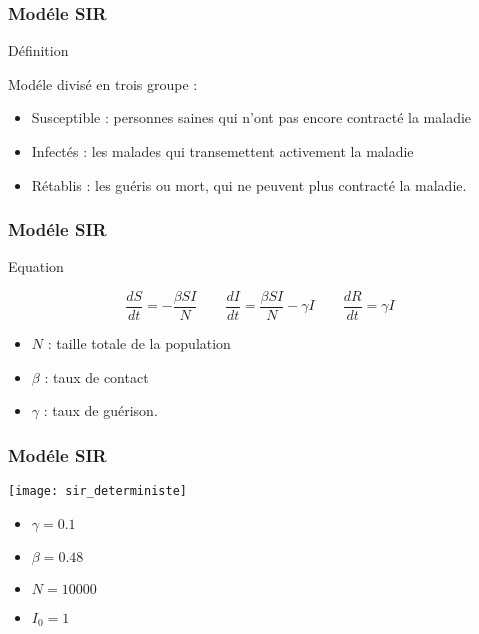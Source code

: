 \begin{frame}
        \frametitle{Modéle SIR}

        \begin{block}{Définition}

                Modéle divisé en trois groupe :
                \begin{itemize}
                        \item Susceptible : personnes saines qui n'ont pas encore contracté la maladie
                        \item Infectés : les malades qui transemettent activement la maladie
                        \item Rétablis : les guéris ou mort, qui ne peuvent plus contracté la maladie.
                \end{itemize}

        \end{block}
\end{frame}

\begin{frame}
        \frametitle{Modéle SIR}

        \begin{alertblock}{Equation}

                $$ \frac{dS}{dt} = -\frac{\beta SI}{N} \qquad \frac{dI}{dt} = \frac{\beta SI}{N} - \gamma I \qquad \frac{dR}{dt} = \gamma I $$

                \begin{itemize}
                        \item $N$ : taille totale de la population
                        \item $\beta$ : taux de contact
                        \item $\gamma$ : taux de guérison.
                \end{itemize}

        \end{alertblock}
\end{frame}

\begin{frame}
        \frametitle{Modéle SIR}

        \centering
        \texttt{[image: sir\_deterministe]}

        \begin{itemize}
                \item $\gamma = 0.1$
                \item $\beta = 0.48$
                \item $N = 10000$
                \item $I_0 = 1$
        \end{itemize}

\end{frame}


